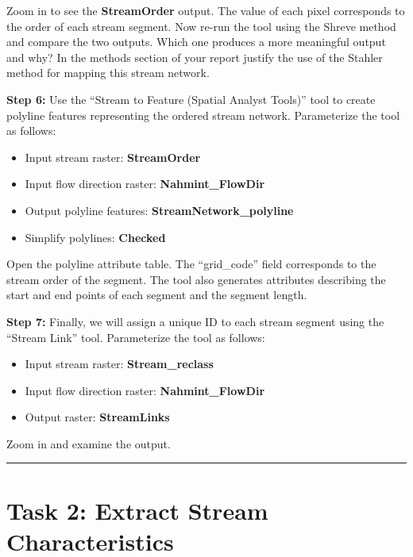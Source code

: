 \documentclass[
]{book}
\providecommand{\tightlist}{%
  \setlength{\itemsep}{0pt}\setlength{\parskip}{0pt}}
\begin{document}
Zoom in to see the \textbf{StreamOrder} output. The value of each pixel corresponds to the order of each stream segment. Now re-run the tool using the Shreve method and compare the two outputs. Which one produces a more meaningful output and why? In the methods section of your report justify the use of the Stahler method for mapping this stream network.

\textbf{Step 6:} Use the ``Stream to Feature (Spatial Analyst Tools)'' tool to create polyline features representing the ordered stream network. Parameterize the tool as follows:

\begin{itemize}
\tightlist
\item
  Input stream raster: \textbf{StreamOrder}
\item
  Input flow direction raster: \textbf{Nahmint\_FlowDir}
\item
  Output polyline features: \textbf{StreamNetwork\_polyline}
\item
  Simplify polylines: \textbf{Checked}
\end{itemize}

Open the polyline attribute table. The ``grid\_code'' field corresponds to the stream order of the segment. The tool also generates attributes describing the start and end points of each segment and the segment length.

\textbf{Step 7:} Finally, we will assign a unique ID to each stream segment using the ``Stream Link'' tool. Parameterize the tool as follows:

\begin{itemize}
\tightlist
\item
  Input stream raster: \textbf{Stream\_reclass}
\item
  Input flow direction raster: \textbf{Nahmint\_FlowDir}
\item
  Output raster: \textbf{StreamLinks}
\end{itemize}

Zoom in and examine the output.

\begin{center}\rule{0.5\linewidth}{0.5pt}\end{center}

\hypertarget{task-2-extract-stream-characteristics}{%
\section{Task 2: Extract Stream Characteristics}\label{task-2-extract-stream-characteristics}}
\end{document}
